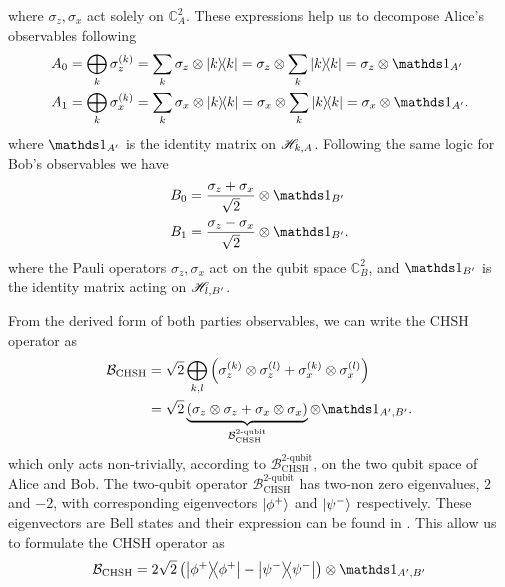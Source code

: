 where $\sigma_z,\sigma_x$ act solely on $\mathds{C}^2_A$.
These expressions help us to decompose Alice's observables following
\begin{equation}
	\begin{split}
		A_0 &= \bigoplus_k \sigma_z^{(k)} = \sum_k \sigma_z \otimes \ketbra{k}  = \sigma_z \otimes \sum_k \ketbra{k} = \sigma_z \otimes \id_{A'} \\
		A_1 &= \bigoplus_k \sigma_x^{(k)} = \sum_k \sigma_x \otimes \ketbra{k}  = \sigma_x \otimes \sum_k \ketbra{k} = \sigma_x \otimes \id_{A'}.
	\end{split}
	\label{eq:pauli_Alice}
\end{equation}
where $\id_{A'}$ is the identity matrix on $\mathscr{H}_{k,A}$.
Following the same logic for Bob's observables we have
\begin{equation}
	\begin{split}
		B_0 &= \frac{\sigma_z + \sigma_x}{\sqrt{2}} \otimes \id_{B'} \\
		B_1 &= \frac{\sigma_z - \sigma_x}{\sqrt{2}} \otimes \id_{B'}.
	\end{split}	
	\label{eq:pauli_Bob}
\end{equation}
where the Pauli operators $\sigma_z,\sigma_x$ act on the qubit space $\mathds{C}^2_B$, and $\id_{B'}$ is the identity matrix acting on $\mathscr{H}_{l,B'}$.

From the derived form of both parties observables, we can write the CHSH operator as
\begin{equation}
	\begin{split}
		\mathcal{B}_\text{CHSH} &= \sqrt{2}\bigoplus_{k,l}\left(\sigma_z^{(k)} \otimes \sigma_z^{(l)} + \sigma_x^{(k)} \otimes \sigma_x^{(l)}\right) \\
								&= \sqrt{2}\underbrace{(\sigma_z \otimes \sigma_z + \sigma_x \otimes \sigma_x)}_{\mathcal{B}_\text{CHSH}^\text{2-qubit}} \otimes \id_{A',B'}.
	\end{split}
\end{equation}
which only acts non-trivially, according to $\mathcal{B}_\text{CHSH}^\text{2-qubit}$, on the two qubit space of Alice and Bob.
The two-qubit operator $\mathcal{B}_\text{CHSH}^\text{2-qubit}$ has two-non zero eigenvalues, $2$ and $-2$, with corresponding eigenvectors $\ket{\phi^+}$ and $\ket{\psi^-}$ respectively. These eigenvectors are Bell states and their expression can be found in .
This allow us to formulate the CHSH operator as
\begin{equation}
	\mathcal{B}_\text{CHSH}	= 2\sqrt{2}\left(\ketbra{\phi^+}-\ketbra{\psi^-}\right) \otimes \id_{A',B'}
\end{equation}

